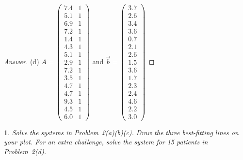 \documentclass [11pt, letterpaper] {amsart}
\theoremstyle{plain}
\newtheorem{exer}{}
\theoremstyle{definition}
\begin{document}
\begin{proof}[Answer]
(d) $A = \left(\begin{matrix}
                    7.4& 1 \\
                    5.1 & 1 \\
                    6.9 & 1\\
                    7.2 & 1\\
                    1.4 & 1\\
                    4.3 &1 \\
                    5.1 & 1\\
                    2.9 & 1\\
                    7.2& 1\\
                    3.5& 1\\
                    4.7& 1\\
                    4.7& 1\\
                    9.3& 1\\
                    4.5& 1\\
                    6.0 &1
                  \end{matrix}\right)$ and  $\vec{b}=\left(\begin{matrix}
                    3.7\\
                    2.6\\
                    3.4\\
                    3.6\\
                    0.7\\
                    2.1\\
                    2.6\\
                    1.5\\
                    3.6\\
                    1.7\\
                    2.3\\
                    2.4\\
                    4.6\\
                    2.2\\
                    3.0
                  \end{matrix}\right)$

\end{proof}





\vspace{0.05in}
\begin{exer}
Solve the systems in Problem~2(a)(b)(c). Draw the three best-fitting lines on your plot. For an extra challenge, solve the system for 15 patients in Problem~2(d).
\end{exer}
\end{document}
